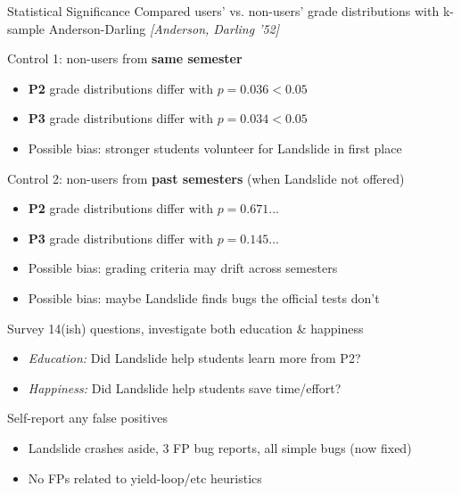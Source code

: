 \documentclass[xcolor=dvipsnames]{beamer}
\begin{document}
\begin{frame}{Statistical Significance}
	Compared users' vs. non-users' grade distributions with k-sample Anderson-Darling {\em [Anderson, Darling '52]}
	\linegap

	Control 1: non-users from {\bf same semester}
	\begin{itemize}
		\item {\bf P2} grade distributions differ with $p = 0.036 < 0.05$
		\item {\bf P3} grade distributions differ with $p = 0.034 < 0.05$
			\pause
		\item Possible bias: stronger students volunteer for Landslide in first place
	\end{itemize}
	\pause
	\linegap

	Control 2: non-users from {\bf past semesters} (when Landslide not offered)
	\begin{itemize}
		\item {\bf P2} grade distributions differ with $p = 0.671$...
		\item {\bf P3} grade distributions differ with $p = 0.145$...
			\pause
		\item Possible bias: grading criteria may drift across semesters
		\item Possible bias: maybe Landslide finds bugs the official tests don't
	\end{itemize}
\end{frame}

\begin{frame}{Survey}
	14(ish) questions, investigate both education \& happiness
	\begin{itemize}
		\item {\em Education:} Did Landslide help students learn more from P2?
		\item {\em Happiness:} Did Landslide help students save time/effort?
	\end{itemize}
	\linegap

	Self-report any false positives
	\begin{itemize}
		\item Landslide crashes aside, 3 FP bug reports, all simple bugs (now fixed)
		\item No FPs related to yield-loop/etc heuristics
	\end{itemize}
\end{frame}
\end{document}
